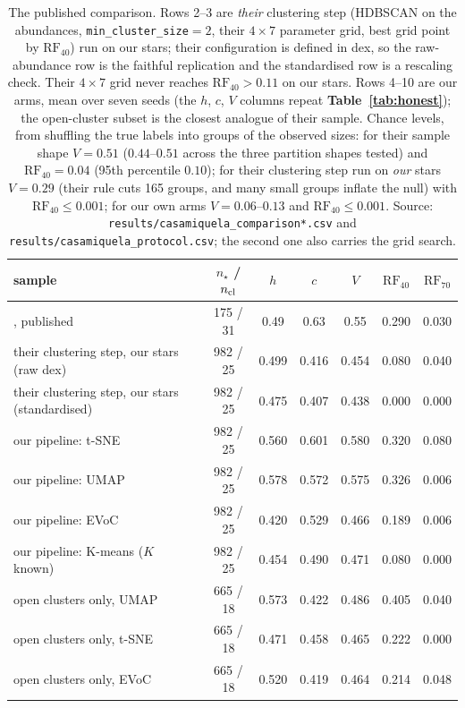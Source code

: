 \begin{table}[htbp]
\centering
\small
{}
\begin{tabular}{@{}lcccccc@{}}
\toprule
sample & $n_\star$ / $n_{\rm cl}$ & $h$ & $c$ & $V$ & $\mathrm{RF}_{40}$ & $\mathrm{RF}_{70}$ \\
\midrule
\citet{Casamiquela:21}, published                  & 175 / 31 & 0.49  & 0.63  & 0.55  & 0.290 & 0.030 \\
their clustering step, our stars (raw dex)         & 982 / 25 & 0.499 & 0.416 & 0.454 & 0.080 & 0.040 \\
their clustering step, our stars (standardised)    & 982 / 25 & 0.475 & 0.407 & 0.438 & 0.000 & 0.000 \\
\midrule
our pipeline: t-SNE                                & 982 / 25 & 0.560 & 0.601 & 0.580 & 0.320 & 0.080 \\
our pipeline: UMAP                                 & 982 / 25 & 0.578 & 0.572 & 0.575 & 0.326 & 0.006 \\
our pipeline: EVoC                                 & 982 / 25 & 0.420 & 0.529 & 0.466 & 0.189 & 0.006 \\
our pipeline: K-means ($K$ known)                  & 982 / 25 & 0.454 & 0.490 & 0.471 & 0.080 & 0.000 \\
\midrule
open clusters only, UMAP                           & 665 / 18 & 0.573 & 0.422 & 0.486 & 0.405 & 0.040 \\
open clusters only, t-SNE                          & 665 / 18 & 0.471 & 0.458 & 0.465 & 0.222 & 0.000 \\
open clusters only, EVoC                           & 665 / 18 & 0.520 & 0.419 & 0.464 & 0.214 & 0.048 \\
\bottomrule
\end{tabular}
\caption{The published comparison. Rows 2--3 are \textit{their} clustering step
(HDBSCAN on the abundances, \texttt{min\_cluster\_size}$=2$, their $4 \times 7$
parameter grid, best grid point by $\mathrm{RF}_{40}$) run on our stars; their
configuration is defined in dex, so the raw-abundance row is the faithful
replication and the standardised row is a rescaling check. Their $4 \times 7$
grid never reaches $\mathrm{RF}_{40} > 0.11$ on our stars. Rows 4--10 are our
arms, mean over seven seeds (the $h$, $c$, $V$ columns repeat
\textbf{Table~\ref{tab:honest}}); the open-cluster subset is the closest
analogue of their sample. Chance levels, from shuffling the true labels into
groups of the observed sizes: for their sample shape $V = 0.51$ ($0.44$--$0.51$
across the three partition shapes tested) and $\mathrm{RF}_{40} = 0.04$ (95th
percentile $0.10$); for their clustering step run on \emph{our} stars $V =
0.29$ (their rule cuts 165 groups, and many small groups inflate the null) with
$\mathrm{RF}_{40} \le 0.001$; for our own arms $V = 0.06$--$0.13$ and
$\mathrm{RF}_{40} \le 0.001$. Source:
\texttt{results/casamiquela\_comparison*.csv} and
\texttt{results/casamiquela\_protocol.csv}; the second one also carries the
grid search.}
\label{tab:literature}
\end{table}

